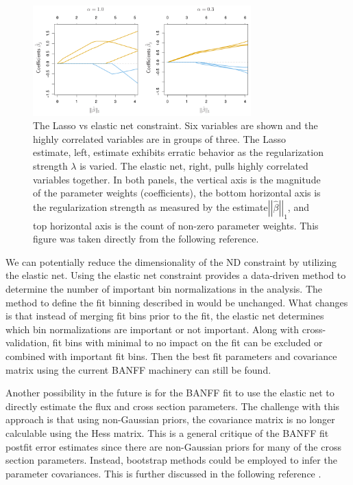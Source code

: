 \begin{figure}
\begin{centering}
\includegraphics[width=0.75\textwidth]{Chapters/Figures/Discussion/LassoVsElasticNet}
\par\end{centering}
\caption[The Lasso vs Elastic Net Constraint]{The Lasso vs elastic net constraint. Six variables are shown and the
highly correlated variables are in groups of three. The Lasso estimate,
left, estimate exhibits erratic behavior as the regularization strength
$\lambda$ is varied. The elastic net, right, pulls highly correlated
variables together. In both panels, the vertical axis is the magnitude
of the parameter weights (coefficients), the bottom horizontal axis
is the regularization strength as measured by the estimate$\left|\left|\hat{\beta}\right|\right|_{1}$,
and top horizontal axis is the count of non-zero parameter weights.
This figure was taken directly from the following reference\cite{alma991031702535903361}.
\label{fig:The-Lasso-vs-elastic-net}}

\end{figure}

We can potentially reduce the dimensionality of the ND constraint
by utilizing the elastic net. Using the elastic net constraint provides
a data-driven method to determine the number of important bin normalizations
in the analysis. The method to define the fit binning described in
 would be unchanged. What changes is that
instead of merging fit bins prior to the fit, the elastic net determines
which bin normalizations are important or not important. Along with
cross-validation, fit bins with minimal to no impact on the fit can
be excluded or combined with important fit bins. Then the best fit
parameters and covariance matrix using the current BANFF machinery
can still be found.

Another possibility in the future is for the BANFF fit to use the
elastic net to directly estimate the flux and cross section parameters.
The challenge with this approach is that using non-Gaussian priors,
the covariance matrix is no longer calculable using the Hess matrix.
This is a general critique of the BANFF fit postfit error estimates
since there are non-Gaussian priors for many of the cross section
parameters. Instead, bootstrap methods could be employed to infer
the parameter covariances. This is further discussed in the following
reference \cite{springer_series978-0-387-84858-7}.

